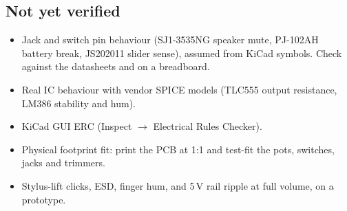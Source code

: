 \documentclass[10pt,a4paper]{article}
\begin{document}
\subsection*{Not yet verified}
\begin{itemize}
\item Jack and switch pin behaviour (SJ1-3535NG speaker mute, PJ-102AH battery break, JS202011 slider sense),
assumed from KiCad symbols. Check against the datasheets and on a breadboard.
\item Real IC behaviour with vendor SPICE models (TLC555 output resistance, LM386 stability and hum).
\item KiCad GUI ERC (Inspect $\rightarrow$ Electrical Rules Checker).
\item Physical footprint fit: print the PCB at 1:1 and test-fit the pots, switches, jacks and trimmers.
\item Stylus-lift clicks, ESD, finger hum, and 5\,V rail ripple at full volume, on a prototype.
\end{itemize}
\end{document}
